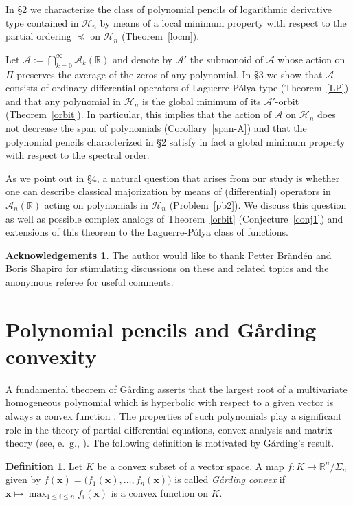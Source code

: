 \documentclass[10pt,twoside,a4paper,reqno]{amsart}
\theoremstyle{plain}
\theoremstyle{definition}
\newtheorem{defi+}           {Definition}
\newtheorem*{ack}            {Acknowledgements}
\theoremstyle{remark}
\newenvironment{definition}{\begin{defi+}}{\end{defi+}}
\newcommand {\bR} {\mathbb {R}}
\newcommand {\calH} {\mathcal {H}}
\newcommand {\calA} {\mathcal {A}}
\newcommand {\vP} {\varPi}
\begin{document}
In \S 2 we characterize the class of polynomial pencils of logarithmic 
derivative type contained in $\calH_{n}$ by means of a local minimum property 
with respect to the 
partial ordering $\preccurlyeq$ on $\calH_{n}$ (Theorem~\ref{locm}). 

Let $\calA:=\bigcap_{k=0}^{\infty}\calA_{k}(\bR)$ and denote by $\calA'$ 
the submonoid of $\calA$ whose action on $\vP$ preserves 
the average of the zeros of any polynomial. In \S 3 we show that 
$\calA$ consists of ordinary differential operators of Laguerre-P\'olya type 
(Theorem~\ref{LP}) and that any polynomial in $\calH_{n}$ is the global 
minimum of its $\calA'$-orbit (Theorem~\ref{orbit}). In particular, this 
implies that the action of $\calA$ on $\calH_{n}$ does not decrease the 
span of polynomials (Corollary~\ref{span-A}) and that the polynomial pencils 
characterized in \S 2 satisfy in fact a global minimum
property with respect to the spectral order. 

As we point out in \S 4, a 
natural question that arises from our study is whether one can
describe classical majorization by means of (differential) operators in 
$\calA_n(\bR)$ acting on polynomials in $\calH_{n}$ (Problem~\ref{pb2}). We 
discuss this question as well as possible complex analogs of 
Theorem~\ref{orbit} (Conjecture~\ref{conj1}) and 
extensions of this theorem to the Laguerre-P\'olya 
class of functions.

\begin{ack}
The author would like to thank Petter Br\"and\'en and Boris Shapiro for 
stimulating 
discussions on these and related topics and the anonymous referee for 
useful comments.
\end{ack}

\section{Polynomial pencils and G\aa rding convexity}

A fundamental theorem of G\aa rding asserts that the largest root of a 
multivariate 
homogeneous polynomial which is hyperbolic with respect to a given vector is 
always a convex function \cite{G}. The properties of such polynomials play 
a significant role 
in the theory of partial differential equations, convex analysis and 
matrix theory (see, e.~g., \cite{BGLS}). The following definition is 
motivated by G\aa rding's result.

\begin{definition}\label{gard}
Let $K$ be a convex subset of a vector space. A map 
$f:K\rightarrow \bR^n/\Sigma_n$ given by 
$f(\mathbf{x})=\big(f_1(\mathbf{x}),\ldots,f_n(\mathbf{x})\big)$ is called 
{\em G\aa rding convex} if 
$\mathbf{x}\mapsto \max_{1\le i\le n}f_i(\mathbf{x})$ is a convex 
function on $K$.
\end{definition}
\end{document}
